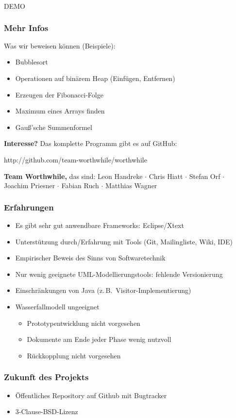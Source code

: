 \documentclass[t,svgnames]{beamer}
\begin{document}
\begin{frame}
	\begin{center}
		\vfill
		\Huge{DEMO}
		\vfill		
	\end{center}
\end{frame}

\begin{frame}
	\frametitle{Mehr Infos}
	
	Was wir beweisen können (Beispiele):
	\begin{itemize}
		\item Bubblesort
		\item Operationen auf binärem Heap (Einfügen, Entfernen)
		\item Erzeugen der Fibonacci-Folge
		\item Maximum eines Arrays finden
		\item Gauß’sche Summenformel
	\end{itemize}
	
	\vspace{1cm}
	
	\textbf{Interesse?} Das komplette Programm gibt es auf GitHub:
	
	\begin{center}
		\textcolor{KITblue}{\Large \textcolor{KITblack30}{http://}github.com/team-worthwhile/worthwhile}
	\end{center}
	
	{\small \textbf{Team Worthwhile,} das sind: Leon Handreke $\cdot$ Chris Hiatt $\cdot$ Stefan Orf $\cdot$ \\ Joachim Priesner $\cdot$ Fabian Ruch $\cdot$ Matthias Wagner}
\end{frame}

\begin{frame}
    \frametitle{Erfahrungen}
    \begin{itemize}
        \item Es gibt sehr gut anwendbare Frameworks: Eclipse/Xtext
        \item Unterstützung durch/Erfahrung mit Tools (Git, Mailingliste, Wiki, IDE)
        \item Empirischer Beweis des Sinns von Softwaretechnik
    \end{itemize}
    \begin{itemize}
        \item Nur wenig geeignete UML-Modellierungstools: fehlende Versionierung
        \item Einschränkungen von Java (z.\,B.\ Visitor-Implementierung)
        \item Wasserfallmodell ungeeignet
        \begin{itemize}
            \item Prototypentwicklung nicht vorgesehen
            \item Dokumente am Ende jeder Phase wenig nutzvoll
            \item Rückkopplung nicht vorgesehen
        \end{itemize}
    \end{itemize}
\end{frame}

\begin{frame}
    \frametitle{Zukunft des Projekts}
    \begin{itemize}
        \item Öffentliches Repository auf Github mit Bugtracker
        \item 3-Clause-BSD-Lizenz
    \end{itemize}
\end{frame}
\end{document}
